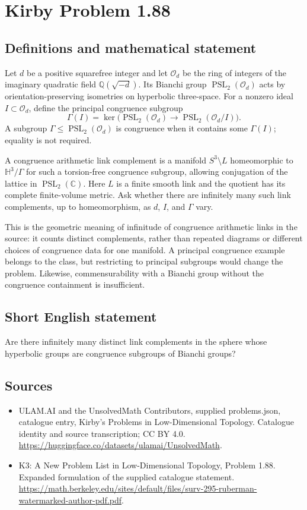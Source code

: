 \documentclass[11pt,a4paper]{article}
\begin{document}
\section*{Kirby Problem 1.88}\label{statement}

\subsection{Definitions and mathematical statement}
Let $d$ be a positive squarefree integer and let $\mathcal O_d$ be the ring of integers of the imaginary quadratic field $\mathbb Q(\sqrt{-d})$. Its Bianchi group $\operatorname{PSL}_2(\mathcal O_d)$ acts by orientation-preserving isometries on hyperbolic three-space. For a nonzero ideal $I\subset\mathcal O_d$, define the principal congruence subgroup
\[
\Gamma(I)=\ker\bigl(\operatorname{PSL}_2(\mathcal O_d)
\longrightarrow\operatorname{PSL}_2(\mathcal O_d/I)\bigr).
\]
A subgroup $\Gamma\le\operatorname{PSL}_2(\mathcal O_d)$ is congruence when it contains some $\Gamma(I)$; equality is not required.

A congruence arithmetic link complement is a manifold $S^3\setminus L$ homeomorphic to $\mathbb H^3/\Gamma$ for such a torsion-free congruence subgroup, allowing conjugation of the lattice in $\operatorname{PSL}_2(\mathbb C)$. Here $L$ is a finite smooth link and the quotient has its complete finite-volume metric. Ask whether there are infinitely many such link complements, up to homeomorphism, as $d$, $I$, and $\Gamma$ vary.

This is the geometric meaning of infinitude of congruence arithmetic links in the source: it counts distinct complements, rather than repeated diagrams or different choices of congruence data for one manifold. A principal congruence example belongs to the class, but restricting to principal subgroups would change the problem. Likewise, commensurability with a Bianchi group without the congruence containment is insufficient.
\subsection{Short English statement}
Are there infinitely many distinct link complements in the sphere whose hyperbolic groups are congruence subgroups of Bianchi groups?
\subsection{Sources}
\begin{itemize}
\item[S1] ULAM.AI and the UnsolvedMath Contributors, supplied problems.json, catalogue entry, Kirby's Problems in Low-Dimensional Topology. Catalogue identity and source transcription; CC BY 4.0.
\url{https://huggingface.co/datasets/ulamai/UnsolvedMath}.
\item[S2] K3: A New Problem List in Low-Dimensional Topology, Problem 1.88. Expanded formulation of the supplied catalogue statement.
\url{https://math.berkeley.edu/sites/default/files/surv-295-ruberman-watermarked-author-pdf.pdf}.
\end{itemize}
\end{document}
